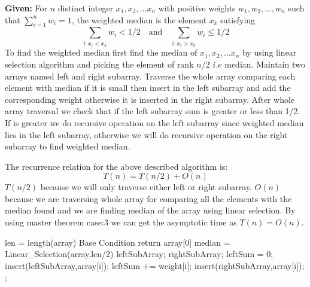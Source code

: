 \documentclass[a4paper,11pt]{article}
\theoremstyle{quest}
\newenvironment{solution}[2][Solution]{\begin{trivlist}
		\item[\hskip \labelsep {\bfseries #1}\hskip \labelsep {\bfseries #2.}]}{\end{trivlist}}
\begin{document}
\newpage
\begin{solution}2
	\textbf{Given: } For $n$ distinct integer $x_1, x_2, \dots x_n$ with positive weights
	$w_1, w_2, \dots, w_n$ such that $\sum_{i=1}^n w_i = 1$, the weighted
	median is the element $x_k$ satisfying 
	\[
	\sum_{i: x_i < x_k} w_i < 1/2 \quad \mbox{and} \quad \sum_{i: x_i > x_k} w_i \leq 1/2
	\]
	To find the weighted median first find the median of $x_1, x_2, \dots x_n$ by using linear selection algorithm and picking the element of rank $n/2$ $i.e$ median. Maintain two arrays named left and right subarray. Traverse the whole array comparing each element with median if it is small then insert in the left subarray and add the corresponding weight otherwise it is inserted in the right subarray. After whole array traversal we check that if the left subarray sum is greater or less than 1/2. If is greater we do recursive operation on the left subarray since weighted median lies in the left subarray, otherwise we will do recursive operation on the right subarray to find weighted median.
	
	The recurrence relation for the above described algorithm is:
	\begin{equation*}
	T(n) = T(n/2) + O(n)
	\end{equation*} 
	$T(n/2)$ because we will only traverse either left or right subarray. $O(n)$ because we are traversing whole array for comparing all the elements with the median found and we are finding median of the array using linear selection. By using master theorem case:3 we can get the asymptotic time as $T(n) = O(n)$.\\
	
	\begin{algorithm}
		\begin{algorithmic}
			\State len = length(array)
			\Comment Base Condition
			\State return array[0]
			\EndIf
			\State median = Linear\_Selection(array,len/2) 
			\State leftSubArray;
			\State rightSubArray;
			\State leftSum = 0;
			\State insert(leftSubArray,array[i]);
			\State leftSum += weight[i];
			\Else
			\State insert(rightSubArray,array[i]);
			\EndIf
			\EndFor
			\State {};
			\Else
			\State {}
			\EndIf
			\EndFunction \\ 	
		\end{algorithmic} 	
	\end{algorithm}

\end{solution} 
\end{document}
